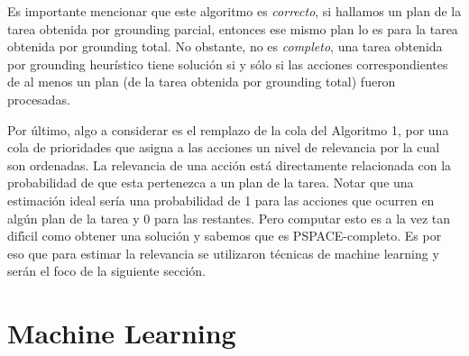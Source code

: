Es importante mencionar que este algoritmo es \emph{correcto}, si hallamos un
plan de la tarea obtenida por grounding parcial, entonces ese mismo plan lo es
para la tarea obtenida por grounding total. No obstante, no es \emph{completo},
una tarea obtenida por grounding heurístico tiene solución si y sólo si las
acciones correspondientes de al menos un plan (de la tarea obtenida por
grounding total) fueron procesadas.

Por último, algo a considerar es el remplazo de la cola del Algoritmo 1, por una
cola de prioridades que asigna a las acciones un nivel de relevancia por la cual
son ordenadas. La relevancia de una acción está directamente relacionada con la
probabilidad de que esta pertenezca a un plan de la tarea. Notar que una
estimación ideal sería una probabilidad de 1 para las acciones que ocurren en
algún plan de la tarea y 0 para las restantes. Pero computar esto es a la vez
tan difı́cil como obtener una solución y sabemos que es PSPACE-completo. Es por
eso que para estimar la relevancia se utilizaron técnicas de machine learning y
serán el foco de la siguiente sección.

\section{Machine Learning}
